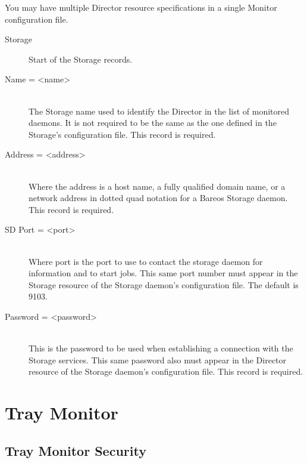 You may have multiple Director resource specifications in a single Monitor
configuration file.

\begin{description}

\item [Storage]
Start of the Storage records.

\item [Name = {\textless}name{\textgreater}] \hfill \\
The Storage name used to identify  the Director in the list of monitored
daemons. It is not required  to be the same as the one defined in the Storage's
configuration file.  This record is required.

\item [Address = {\textless}address{\textgreater}] \hfill \\
Where the address is a host  name, a fully qualified domain name, or a network
address in  dotted quad notation for a Bareos Storage daemon.  This record is
required.

\item [SD Port = {\textless}port{\textgreater}] \hfill \\
Where port is the port to use to  contact the storage daemon for information
and to start jobs.  This same port number must appear in the Storage resource
of the  Storage daemon's configuration file. The default is 9103.

\item [Password = {\textless}password{\textgreater}] \hfill \\
This is the password to be used  when establishing a connection with the
Storage services. This  same password also must appear in the Director
resource of the Storage  daemon's configuration file. This record is required.

\end{description}

\section{Tray Monitor}

\subsection*{Tray Monitor Security}

